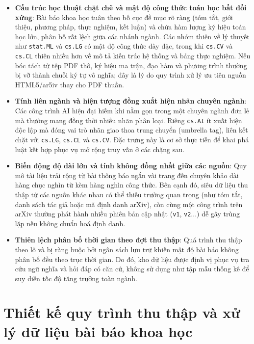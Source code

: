 \begin{itemize}
    \item[--] \textbf{Cấu trúc học thuật chặt chẽ và mật độ công thức toán học bất đối xứng}: Bài báo khoa học tuân theo bố cục đề mục rõ ràng (tóm tắt, giới thiệu, phương pháp, thực nghiệm, kết luận) và chứa hàm lượng ký hiệu toán học lớn, phân bố rất lệch giữa các nhánh ngành. Các nhóm thiên về lý thuyết như \texttt{stat.ML} và \texttt{cs.LG} có mật độ công thức dày đặc, trong khi \texttt{cs.CV} và \texttt{cs.CL} thiên nhiều hơn về mô tả kiến trúc hệ thống và bảng thực nghiệm. Nếu bóc tách từ tệp PDF thô, ký hiệu ma trận, đạo hàm và phương trình thường bị vỡ thành chuỗi ký tự vô nghĩa; đây là lý do quy trình xử lý ưu tiên nguồn HTML5/ar5iv thay cho PDF thuần.
    \item[--] \textbf{Tính liên ngành và hiện tượng đồng xuất hiện nhãn chuyên ngành}: Các công trình AI hiện đại hiếm khi nằm gọn trong một chuyên ngành đơn lẻ mà thường mang đồng thời nhiều nhãn phân loại. Riêng \texttt{cs.AI} ít xuất hiện độc lập mà đóng vai trò nhãn giao thoa trung chuyển (umbrella tag), liên kết chặt với \texttt{cs.LG}, \texttt{cs.CL} và \texttt{cs.CV}. Đặc trưng này là cơ sở thực tiễn để khai phá luật kết hợp phục vụ mở rộng truy vấn ở các chặng sau.
    \item[--] \textbf{Biến động độ dài lớn và tính không đồng nhất giữa các nguồn}: Quy mô tài liệu trải rộng từ bài thông báo ngắn vài trang đến chuyên khảo dài hàng chục nghìn từ kèm hàng nghìn công thức. Bên cạnh đó, siêu dữ liệu thu thập từ các nguồn khác nhau có thể thiếu trường quan trọng (như tóm tắt, danh sách tác giả hoặc mã định danh arXiv), còn cùng một công trình trên arXiv thường phát hành nhiều phiên bản cập nhật (\texttt{v1}, \texttt{v2}...) dễ gây trùng lặp nếu không chuẩn hoá định danh.
    \item[--] \textbf{Thiên lệch phân bố thời gian theo đợt thu thập}: Quá trình thu thập theo lô và bị ràng buộc bởi ngân sách lưu trữ khiến mật độ bài báo không phân bố đều theo trục thời gian. Do đó, kho dữ liệu được định vị phục vụ tra cứu ngữ nghĩa và hỏi đáp có căn cứ, không sử dụng như tập mẫu thống kê để suy diễn tốc độ tăng trưởng toàn ngành.
\end{itemize}

\section{Thiết kế quy trình thu thập và xử lý dữ liệu bài báo khoa học}
\label{sec:thu-thap-du-lieu}

